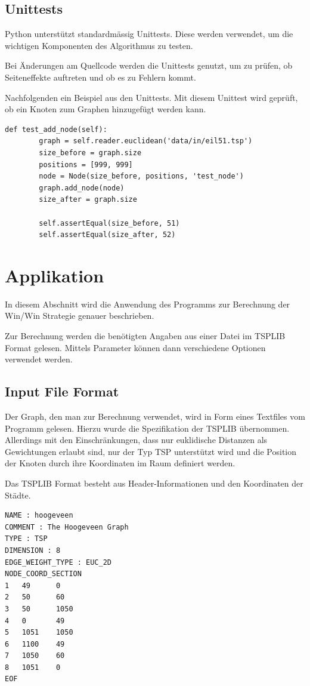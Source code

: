 \documentclass[11pt,a4paper]{article}
\begin{document}
\newpage

\subsection{Unittests}
Python unterstützt standardmässig Unittests. Diese werden verwendet, um die wichtigen Komponenten des Algorithmus zu testen.

Bei Änderungen am Quellcode werden die Unittests genutzt, um zu prüfen, ob Seiteneffekte auftreten und ob es zu Fehlern kommt.

Nachfolgenden ein Beispiel aus den Unittests. Mit diesem Unittest wird geprüft, ob ein Knoten zum Graphen hinzugefügt werden kann.

\begin{verbatim}
def test_add_node(self):
        graph = self.reader.euclidean('data/in/eil51.tsp')
        size_before = graph.size
        positions = [999, 999]
        node = Node(size_before, positions, 'test_node')
        graph.add_node(node)
        size_after = graph.size
    
        self.assertEqual(size_before, 51) 
        self.assertEqual(size_after, 52)
\end{verbatim}
\newpage

\section{Applikation}
In diesem Abschnitt wird die Anwendung des Programms zur Berechnung der Win/Win Strategie genauer beschrieben.

Zur Berechnung werden die benötigten Angaben aus einer Datei im TSPLIB Format gelesen. Mittels Parameter können dann verschiedene Optionen verwendet werden.

\subsection{Input File Format}
Der Graph, den man zur Berechnung verwendet, wird in Form eines Textfiles vom Programm gelesen. Hierzu wurde die Spezifikation der TSPLIB übernommen. Allerdings mit den Einschränkungen, dass nur euklidische Distanzen als Gewichtungen erlaubt sind, nur der Typ TSP unterstützt wird und die Position der Knoten durch ihre Koordinaten im Raum definiert werden.

Das TSPLIB Format besteht aus Header-Informationen und den Koordinaten der Städte.

\begin{verbatim}
NAME : hoogeveen 
COMMENT : The Hoogeveen Graph 
TYPE : TSP 
DIMENSION : 8 
EDGE_WEIGHT_TYPE : EUC_2D
NODE_COORD_SECTION
1   49      0   
2   50      60  
3   50      1050
4   0       49  
5   1051    1050
6   1100    49  
7   1050    60  
8   1051    0   
EOF
\end{verbatim}
\end{document}
